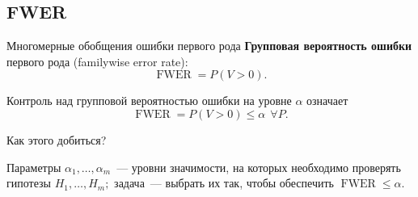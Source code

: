 \documentclass[9pt,pdf,utf8,hyperref={unicode},aspectratio=169]{beamer}
\renewcommand{\leq}{\leqslant}
\DeclareMathOperator{\FWER}{FWER}
\begin{document}
\subsection{FWER}
\begin{frame}{Многомерные обобщения ошибки первого рода}
    \textbf{Групповая вероятность ошибки} первого рода (familywise error rate):
    $$\FWER = P\left(V>0\right).$$

    \bigskip

    Контроль над групповой вероятностью ошибки на уровне $\alpha$ означает $$\FWER = P \left( V >0 \right) \leq \alpha ~~\forall P.$$

    \bigskip

    Как этого добиться?

    Параметры $\alpha_1,\ldots,\alpha_m$~--- уровни значимости, на которых необходимо проверять гипотезы $H_1,\ldots,H_m;$ задача~--- выбрать их так, чтобы обеспечить $\FWER\leq\alpha.$
\end{frame}
\end{document}
